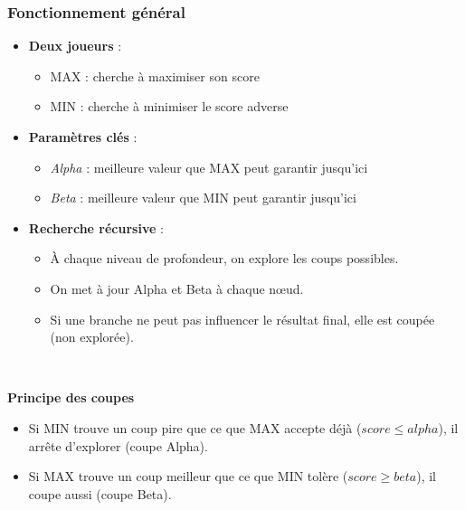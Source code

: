 \documentclass[9pt]{beamer}
\begin{document}
\begin{frame}
  \frametitle{Fonctionnement général}
  \begin{itemize}
    \item \textbf{Deux joueurs }: 
    \begin{itemize}
      \item MAX : cherche à maximiser son score
      \item MIN : cherche à minimiser le score adverse
    \end{itemize}
    \item \textbf{Paramètres clés} :
    \begin{itemize}
      \item \textit{Alpha} : meilleure valeur que MAX peut garantir jusqu’ici
      \item \textit{Beta} : meilleure valeur que MIN peut garantir jusqu’ici
    \end{itemize}
    \item \textbf{Recherche récursive} :
    \begin{itemize}
      \item À chaque niveau de profondeur, on explore les coups possibles.
      \item On met à jour Alpha et Beta à chaque nœud.
      \item Si une branche ne peut pas influencer le résultat final, elle est coupée (non explorée).
    \end{itemize}
  \end{itemize}

  ~


  \textbf{Principe des coupes }
  \begin{itemize}
    \item Si MIN trouve un coup pire que ce que MAX accepte déjà (\textit{$score \leq alpha$}), il arrête d'explorer (coupe Alpha).
    \item Si MAX trouve un coup meilleur que ce que MIN tolère (\textit{$score \geq beta$}), il coupe aussi (coupe Beta).
  \end{itemize}
\end{frame}
\end{document}
